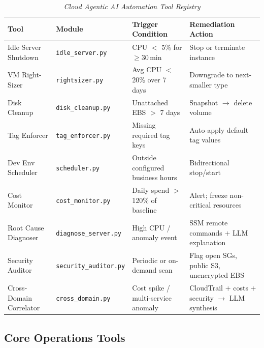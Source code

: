 \documentclass{ieeeaccess}
\begin{document}
\begin{table}[t]
\caption{\textit{Cloud Agentic AI Automation Tool Registry}}
\centering
\setlength{\tabcolsep}{5pt}
\begin{tabular}{p{2.8cm} p{3.2cm} p{4.0cm} p{4.5cm}}
\toprule
\textbf{Tool} & \textbf{Module} & \textbf{Trigger Condition} & \textbf{Remediation Action} \\
\midrule
Idle Server Shutdown  & \texttt{idle\_server.py}     & CPU $<$ 5\% for $\geq$30\,min            & Stop or terminate instance \\
VM Right-Sizer        & \texttt{rightsizer.py}       & Avg CPU $<$ 20\% over 7 days             & Downgrade to next-smaller type \\
Disk Cleanup          & \texttt{disk\_cleanup.py}    & Unattached EBS $>$ 7 days                & Snapshot $\rightarrow$ delete volume \\
Tag Enforcer          & \texttt{tag\_enforcer.py}    & Missing required tag keys                & Auto-apply default tag values \\
Dev Env Scheduler     & \texttt{scheduler.py}        & Outside configured business hours        & Bidirectional stop/start \\
Cost Monitor          & \texttt{cost\_monitor.py}    & Daily spend $>$ 120\% of baseline        & Alert; freeze non-critical resources \\
Root Cause Diagnoser  & \texttt{diagnose\_server.py} & High CPU / anomaly event                 & SSM remote commands $+$ LLM explanation \\
Security Auditor      & \texttt{security\_auditor.py}& Periodic or on-demand scan               & Flag open SGs, public S3, unencrypted EBS \\
Cross-Domain Correlator & \texttt{cross\_domain.py}  & Cost spike / multi-service anomaly       & CloudTrail $+$ costs $+$ security $\rightarrow$ LLM synthesis \\
\bottomrule
\end{tabular}
\label{tab:tools}
\end{table}

\subsection{Core Operations Tools}
\end{document}

